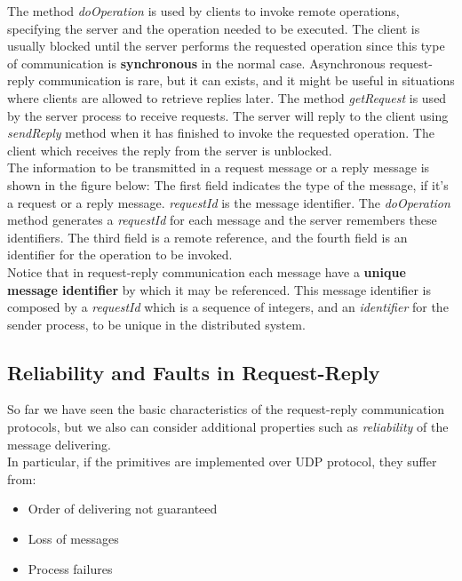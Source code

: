 \documentclass[11pt,a4paper]{article}
\begin{document}
The method \textit{doOperation} is used by clients to invoke remote operations, specifying the server and the operation needed to be executed. The client is usually blocked until the server performs the requested operation since this type of communication is \textbf{synchronous} in the normal case. Asynchronous request-reply communication is rare, but it can exists, and it might be useful in situations where clients are allowed to retrieve replies later. The method \textit{getRequest} is used by the server process to receive requests. The server will reply to the client using \textit{sendReply} method when it has finished to invoke the requested operation. The client which receives the reply from the server is unblocked.\\

The information to be transmitted in a request message or a reply message is shown in the figure below:
The first field indicates the type of the message, if it's a request or a reply message. \textit{requestId} is the message identifier. The \textit{doOperation} method generates a \textit{requestId} for each message and the server remembers these identifiers. The third field is a remote reference, and the fourth field is an identifier for the operation to be invoked.\\

Notice that in request-reply communication each message have a \textbf{unique message identifier} by which it may be referenced. This message identifier is composed by a  \textit{requestId} which is a sequence of integers, and
an \textit{identifier} for the sender process, to be unique in the distributed system.

\subsection{Reliability and Faults in Request-Reply}
So far we have seen the basic characteristics of the request-reply communication protocols, but we also can consider additional properties such as \textit{reliability} of the message delivering. \\

In particular, if the primitives are implemented over UDP protocol, they suffer from:
\begin{itemize}
	\item Order of delivering not guaranteed
	\item Loss of messages
	\item Process failures
\end{itemize}
\end{document}
